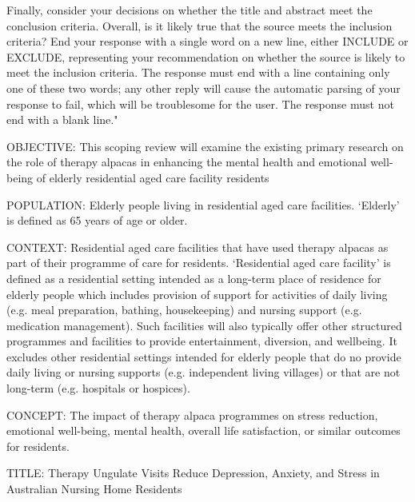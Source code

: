 \documentclass{article}
\begin{document}
\begin{description}
    Finally, consider your decisions on whether the title and abstract meet the
    conclusion criteria. Overall, is it likely true that the source meets the
    inclusion criteria? End your response with a single word on a new line, either
    INCLUDE or EXCLUDE, representing your recommendation on whether the source is
    likely to meet the inclusion criteria. The response must end with a line
    containing only one of these two words; any other reply will cause the
    automatic parsing of your response to fail, which will be troublesome for the
    user. The response must not end with a blank line."

  \User OBJECTIVE: This scoping review will examine the existing primary
  research on the role of therapy alpacas in enhancing the mental health and
  emotional well-being of elderly residential aged care facility residents
  
  POPULATION: Elderly people living in residential aged care facilities.
  `Elderly' is defined as 65 years of age or older. 

  CONTEXT: Residential aged care facilities that have used therapy alpacas as
  part of their programme of care for residents. `Residential aged care
  facility' is defined as a residential setting intended as a long-term place
  of residence for elderly people which includes provision of support for
  activities of daily living (e.g. meal preparation, bathing, housekeeping) and
  nursing support (e.g. medication management). Such facilities will also
  typically offer other structured programmes and facilities to provide
  entertainment, diversion, and wellbeing. It excludes other residential
  settings intended for elderly people that do no provide daily living or
  nursing supports (e.g. independent living villages) or that are not long-term
  (e.g. hospitals or hospices). 

  CONCEPT: The impact of therapy alpaca programmes on stress reduction,
  emotional well-being, mental health, overall life satisfaction, or similar
  outcomes for residents.

  TITLE: Therapy Ungulate Visits Reduce Depression, Anxiety, and Stress
  in Australian Nursing Home Residents


\end{description}
\end{document}
